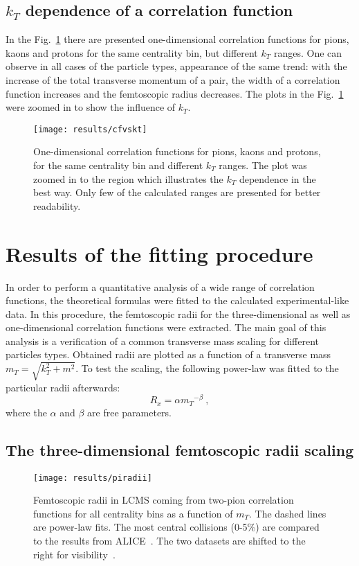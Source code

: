     \subsection{$k_T$ dependence of a correlation function}
      In the Fig.~\ref{fig:kt_dep} there are presented one-dimensional correlation functions for pions, kaons and protons for the same centrality bin, but different $k_T$ ranges.
      One can observe in all cases of the particle types, appearance of the same trend: with the increase of the total transverse momentum of a pair, the width of a correlation function increases and the femtoscopic radius decreases.
      The plots in the Fig.~\ref{fig:kt_dep} were zoomed in to show the influence of $k_T$.

      \begin{figure}[h]
        \centering
        \centerline{\texttt{[image: results/cfvskt]}}
        \caption{One-dimensional correlation functions for pions, kaons and protons, for the same centrality bin and different $k_T$ ranges. The plot was zoomed in to the region which illustrates the $k_T$ dependence in the best way. Only few of the calculated ranges are presented for better readability.}
      \label{fig:kt_dep}
      \end{figure}
    \FloatBarrier
    \clearpage
  \section{Results of the fitting procedure}
  In order to perform a quantitative analysis of a wide range of correlation functions, the theoretical formulas were fitted to the calculated experimental-like data.
  In this procedure, the femtoscopic radii for the three-dimensional as well as one-dimensional correlation functions were extracted.
  The main goal of this analysis is a verification of a common transverse mass scaling for different particles types.
  Obtained radii are plotted as a function of a transverse mass $m_T = \sqrt{k_T^2 +m^2}$.
  To test the scaling, the following power-law was fitted to the particular radii afterwards:
  \begin{equation}
    \label{eq:power-law}
    R_x = \alpha {m_T}^{-\beta}~,
  \end{equation}
  where the $\alpha$ and $\beta$ are free parameters.
    \subsection{The three-dimensional femtoscopic radii scaling}
      \begin{figure}[b]
        \centering
        \centerline{\texttt{[image: results/piradii]}}
        \caption{Femtoscopic radii in LCMS coming from two-pion correlation functions for all centrality bins as a function of $m_T$. The dashed lines are power-law fits. The most central collisions (0-5\%) are compared to the results from ALICE~\cite{alice_pion}. The two datasets are shifted to the right for visibility~\cite{galazyn}.}
        \label{fig:piradii}
      \end{figure}

